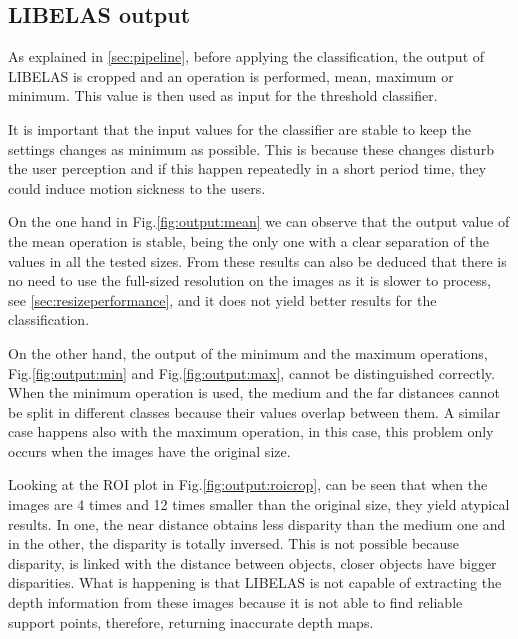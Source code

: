 \documentclass[10pt,a4paper,twocolumn,twoside]{article}
\begin{document}
	\subsection{LIBELAS output}
	\label{sec:libelasOutput}
	As explained in \ref{sec:pipeline}, before applying the classification, the output of LIBELAS is cropped and an operation is performed, mean, maximum or minimum. This value is then used as input for the threshold classifier.  
	
	It is important that the input values for the classifier are stable to keep the settings changes as minimum as possible. This is because these changes disturb the user perception and if this happen repeatedly in a short period time, they could induce motion sickness to the users.  
	
	On the one hand in Fig.\ref{fig:output:mean} we can observe that the output value of the mean operation is stable, being the only one with a clear separation of the values in all the tested sizes. From these results can also be deduced that there is no need to use the full-sized resolution on the images as it is slower to process, see \ref{sec:resizeperformance}, and it does not yield better results for the classification. 
	
	On the other hand, the output of the minimum and the maximum operations, Fig.\ref{fig:output:min} and Fig.\ref{fig:output:max}, cannot be distinguished correctly. When the minimum operation is used, the medium and the far distances cannot be split in different classes because their values overlap between them. A similar case happens also with the maximum operation, in this case, this problem only occurs when the images have the original size.
	
	
	Looking at the ROI plot in Fig.\ref{fig:output:roicrop}, can be seen that when the images are 4 times and 12 times smaller than the original size, they yield atypical results. In one, the near distance obtains less disparity than the medium one and in the other, the disparity is totally inversed. This is not possible because disparity, is linked with the distance between objects, closer objects have bigger disparities. What is happening is that LIBELAS is not capable of extracting the depth information from these images because it is not able to find reliable support points, therefore, returning inaccurate depth maps. 
	
\end{document}
